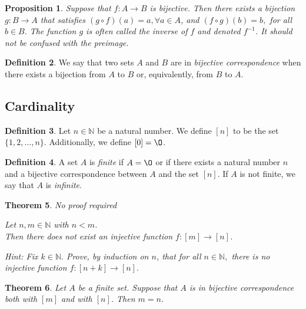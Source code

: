 \documentclass[11pt]{article}
\renewcommand{\emptyset}{\O}
\newtheorem{theorem}{Theorem}[section]
\newtheorem{proposition}[theorem]{Proposition}
\theoremstyle{definition}
\newtheorem{definition}[theorem]{Definition}
\numberwithin{equation}{subsection}
\newcommand{\meta}[1]{{\color{green} #1}}
\begin{document}
\begin{proposition} 
Suppose that $f \colon A \rightarrow B$ is bijective.  
Then there exists a bijection $g \colon B \rightarrow A$ that satisfies $(g\circ f)(a)=a, \forall a\in A$, and $(f\circ g)(b)=b,$ for all $b\in B.$ 
The function $g$ is often called the \emph{inverse} of $f$ and  denoted $f^{-1}$. It should not be confused with the preimage. 
\end{proposition}



\begin{definition}
We say that two sets $A$ and $B$ are in \emph{bijective correspondence} when there exists a bijection from $A$ to $B$ or, equivalently, from $B$ to $A$.
\end{definition}




\subsection*{Cardinality}

\begin{definition}  
Let $n \in \mathbb{N}$ be a natural number.  We define $[n]$ to be the set $\{1, 2, \dotsc, n \}$.  
Additionally, we define $[0]=\emptyset$.
\end{definition}

\begin{definition}  
A set $A$ is \emph{finite} if $A=\emptyset$ or if there exists a natural number $n$ and a bijective correspondence between $A$ and the set $[n].$   If $A$ is not finite, we say that $A$ is \emph{infinite}.
\end{definition}




\begin{theorem}  \meta{No proof required}

Let $n, m\in {\mathbb N}$ with $n<m$.  \\ Then there does not exist an injective function
$f:[m]\rightarrow [n]$.
\end{theorem}
{\it Hint: Fix $k\in\mathbb N.$ Prove, by induction on $n$, that for all $n\in\mathbb{N},$ there is no injective function $f:[n+k]\longrightarrow [n].$} 


\begin{theorem}  \label{bij}
Let $A$ be a finite set. Suppose that $A$ is in bijective correspondence both with $[m]$ and with $[n]$.  Then $m = n$.
\end{theorem}
\end{document}

